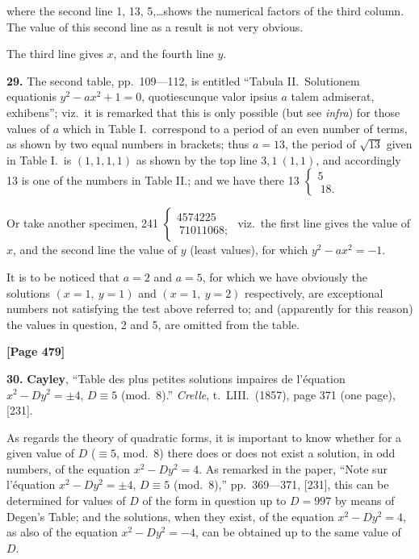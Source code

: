 \documentclass[11pt,a4paper]{book}
\begin{document}
where the second line 1, 13, 5,\ldots shows the numerical factors of the third column.
The value of this second line as a result is not very obvious.

The third line gives $x$, and the fourth line $y$.

\textbf{29.} The second table, pp.\ 109---112, is entitled ``Tabula II.\ Solutionem equationis
$y^{2} - ax^{2} + 1 = 0$, quotiescunque valor ipsius $a$ talem admiserat, exhibens'';
viz.\ it is remarked that this is only possible (but see \textit{infra}) for those values of $a$ which in
Table I.\ correspond to a period of an even number of terms, as shown by two
equal numbers in brackets; thus $a = 13$, the period of $\sqrt{13}$ given in Table I.\ is
$(1, 1, 1, 1)$ as shown by the top line $3, 1\ (1, 1)$, and accordingly 13 is one of
the numbers in Table II.; and we have there 13 $\begin{cases} 5 \\\ 18. \end{cases}$

Or take another specimen, 241 $\begin{cases} 4574225 \\\ 71011068; \end{cases}$
viz.\ the first line gives the value of $x$, and the second line the value of $y$ (least values),
for which $y^{2} - ax^{2} = -1$.

It is to be noticed that $a = 2$ and $a = 5$, for which we have obviously the
solutions $(x = 1,\ y = 1)$ and $(x = 1,\ y = 2)$ respectively, are exceptional numbers not
satisfying the test above referred to; and (apparently for this reason) the values in
question, 2 and 5, are omitted from the table.

\newpage
\textbf{[Page 479]}

\textbf{30.} \textbf{Cayley}, ``Table des plus petites solutions impaires de l'\' equation $x^{2} - Dy^{2} = \pm 4$,
$D \equiv 5$ (mod.\ 8).'' \textit{Crelle}, t.\ LIII.\ (1857), page 371 (one page), [231].

As regards the theory of quadratic forms, it is important to know whether for
a given value of $D$ ($\equiv 5$, mod.\ 8) there does or does not exist a solution, in odd
numbers, of the equation $x^{2} - Dy^{2} = 4$. As remarked in the paper, ``Note sur l'\' equation
$x^{2} - Dy^{2} = \pm 4$, $D \equiv 5$ (mod.\ 8),'' pp.\ 369---371, [231], this can be determined for values
of $D$ of the form in question up to $D = 997$ by means of Degen's Table; and the
solutions, when they exist, of the equation $x^{2} - Dy^{2} = 4$, as also of the equation
$x^{2} - Dy^{2} = -4$, can be obtained up to the same value of $D$.
\end{document}
